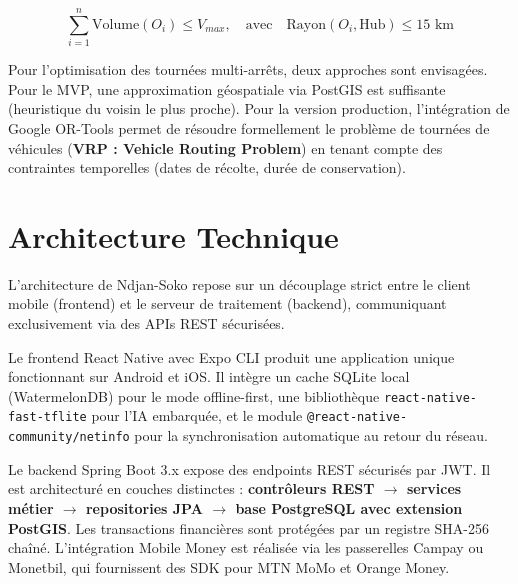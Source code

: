 \documentclass[12pt,a4paper]{report}
\begin{document}
\begin{equation}
\sum_{i=1}^{n} \text{Volume}(O_i) \leq V_{max}, \quad \text{avec} \quad \text{Rayon}(O_i, \text{Hub}) \leq 15 \text{ km}
\end{equation}

Pour l'optimisation des tournées multi-arrêts, deux approches sont envisagées. Pour le MVP, une approximation géospatiale via PostGIS est suffisante (heuristique du voisin le plus proche). Pour la version production, l'intégration de Google OR-Tools permet de résoudre formellement le problème de tournées de véhicules (\textbf{VRP : Vehicle Routing Problem}) en tenant compte des contraintes temporelles (dates de récolte, durée de conservation).

\section{Architecture Technique}

L'architecture de Ndjan-Soko repose sur un découplage strict entre le client mobile (frontend) et le serveur de traitement (backend), communiquant exclusivement via des APIs REST sécurisées.

Le frontend React Native avec Expo CLI produit une application unique fonctionnant sur Android et iOS. Il intègre un cache SQLite local (WatermelonDB) pour le mode offline-first, une bibliothèque \texttt{react-native-fast-tflite} pour l'IA embarquée, et le module \texttt{@react-native-community/netinfo} pour la synchronisation automatique au retour du réseau.

Le backend Spring Boot 3.x expose des endpoints REST sécurisés par JWT. Il est architecturé en couches distinctes : \textbf{contrôleurs REST $\to$ services métier $\to$ repositories JPA $\to$ base PostgreSQL avec extension PostGIS}. Les transactions financières sont protégées par un registre SHA-256 chaîné. L'intégration Mobile Money est réalisée via les passerelles Campay ou Monetbil, qui fournissent des SDK pour MTN MoMo et Orange Money.
\end{document}
